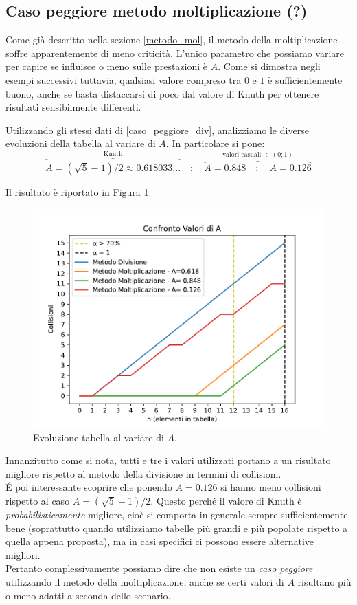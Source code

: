 \subsection{Caso peggiore metodo moltiplicazione (?)} \label{worst_case_mol}
Come già descritto nella sezione \ref{metodo_mol}, il metodo della moltiplicazione soffre apparentemente di meno criticità. L'unico parametro che possiamo variare per capire se influisce o meno sulle prestazioni è $A$. Come si dimostra negli esempi successivi tuttavia, qualsiasi valore compreso tra $0$ e $1$ è sufficientemente buono, anche se basta distaccarsi di poco dal valore di Knuth per ottenere risultati sensibilmente differenti.


Utilizzando gli stessi dati di \ref{caso_peggiore_div}, analizziamo le diverse evoluzioni della tabella al variare di $A$. In particolare si pone:
\[
\overbrace{A=(\sqrt{5}-1)/2 \approx 0.618033...}^{\text{Knuth}} \quad ; \quad \overbrace{A=0.848 \quad ; \quad A=0.126}^{\text{valori casuali } \in (0;1)}
\]

Il risultato è riportato in Figura \ref{fig:worstcase_mul}. 

\begin{figure}[h]
    \begin{center}
    \includegraphics[scale=0.65]{src/img/worstcase_mul.pdf}
    \caption{Evoluzione tabella al variare di $A$.}
     \label{fig:worstcase_mul}
    \end{center}
\end{figure}
 
Innanzitutto come si nota, tutti e tre i valori utilizzati portano a un risultato migliore rispetto al metodo della divisione in termini di collisioni. \\ 
\'E poi interessante scoprire che ponendo $A = 0.126$ si hanno meno collisioni rispetto al caso $A=(\sqrt{5}-1)/2$. Questo perché il valore di Knuth è \emph{probabilisticamente} migliore, cioè si comporta in generale sempre sufficientemente bene (soprattutto quando utilizziamo tabelle più grandi e più popolate rispetto a quella appena proposta), ma in casi specifici ci possono essere alternative migliori. \\
Pertanto complessivamente possiamo dire che non esiste un \emph{caso peggiore} utilizzando il metodo della moltiplicazione, anche se certi valori di $A$ risultano più o meno adatti a seconda dello scenario.